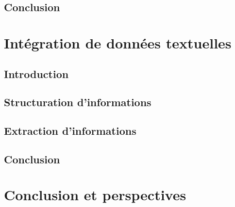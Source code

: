\chapter{Conclusion}



\part{Intégration de données textuelles}

\chapter{Introduction}


\chapter{Structuration d'informations}


\chapter{Extraction d'informations}


\chapter{Conclusion}



\part{Conclusion et perspectives}


\cleardoublepage    %
\appendix

\clearpage
\backmatter


\printglossary
{}
\printglossary[type=acronym]
